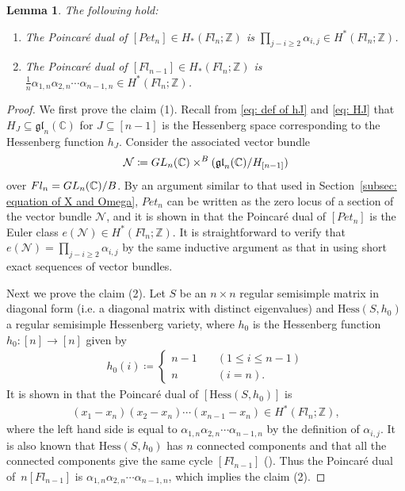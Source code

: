 \documentclass[11pt]{article}
\newtheorem{lemma}[theo]{Lemma}
\theoremstyle{definition}
\numberwithin{equation}{section}
\numberwithin{equation}{section}
\begin{document}
\begin{lemma}\label{lem: Poincare dual}
The following hold:
\begin{enumerate}
 \item The Poincar\'e dual of $[Pet_{n}]\in H_*(Fl_n;{\mathbb Z})$ is $\prod_{j-i\ge2}\alpha_{i, j}\in H^*(Fl_n;{\mathbb Z})$.
 \item The Poincar\'e dual of $[Fl_{n-1}]\in H_*(Fl_n;{\mathbb Z})$ is $\frac{1}{n}\alpha_{1,n}\alpha_{2,n}\cdots\alpha_{n-1,n}\in H^*(Fl_n;{\mathbb Z})$.
\end{enumerate}
\end{lemma}

\begin{proof}
We first prove the claim (1). Recall from \eqref{eq: def of hJ} and \eqref{eq: HJ} that $H_J\subseteq \mathfrak{gl}_n({\mathbb C})$ for $J\subseteq[n-1]$ is the Hessenberg space corresponding to the Hessenberg function $h_J$. Consider the associated vector bundle 
\begin{align*}
\mathcal{N}\coloneqq {\rm GL}_n({\mathbb C})\times^B (\mathfrak{gl}_n({\mathbb C})/H_{[n-1]})
\end{align*}
over $Fl_n={\rm GL}_n({\mathbb C})/B$. By an argument similar to that used in Section~\ref{subsec: equation of X and Omega}, $Pet_{n}$ can be written as the zero locus of a section of the vector bundle $\mathcal{N}$, and it is shown in \cite[Corollary~3.9]{ab-fu-ze} that the Poincar\'e dual of $[Pet_{n}]$ is the Euler class $e(\mathcal{N})\in H^*(Fl_n;{\mathbb Z})$. It is straightforward to verify that $e(\mathcal{N})=\prod_{j-i\ge2}\alpha_{i, j}$ by the same inductive argument as that in \cite[Sect.\ 4]{ab-fu-ze} using short exact sequences of vector bundles.

Next we prove the claim (2). Let $S$ be an $n\times n$ regular semisimple matrix in diagonal form (i.e. a diagonal matrix with distinct eigenvalues) and $\text{Hess}(S,h_0)$ a regular semisimple Hessenberg variety, where $h_0$ is the Hessenberg function $h_0\colon [n]\rightarrow [n]$ given by
\begin{align*}
h_0(i) \coloneqq
\begin{cases}
n-1 \quad &(1\le i\le n-1) \\
n &(i=n).
\end{cases}
\end{align*}
It is shown in \cite[Sect,\ 3 and Sect.\ 4]{an-ty} that the Poincar\'{e} dual of $[\text{Hess}(S,h_0)]$ is 
\begin{align*}
(x_1-x_n)(x_2-x_n)\cdots (x_{n-1}-x_n)
\in H^*(Fl_n;{\mathbb Z}),
\end{align*}
where the left hand side is equal to $\alpha_{1,n}\alpha_{2,n}\cdots\alpha_{n-1,n}$ by the  definition of $\alpha_{i,j}$. It is also known that $\text{Hess}(S,h_0)$ has $n$ connected components and that all the connected components give the same cycle $[Fl_{n-1}]$ (\cite[Sect.\ 3]{Teff11}). Thus the Poincar\'e dual of~$n[Fl_{n-1}]$ is 
$\alpha_{1,n}\alpha_{2,n}\cdots\alpha_{n-1,n}$, which implies the claim (2).
\end{proof}
\end{document}
